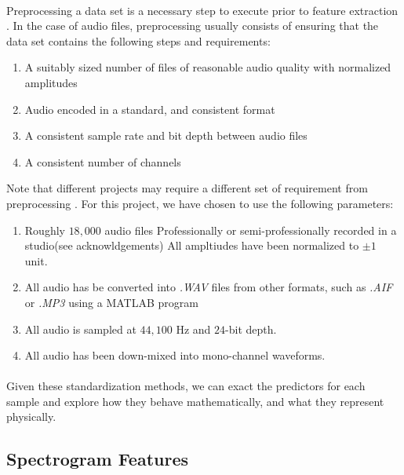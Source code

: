 \documentclass[12pt,letterpaper]{article}
\begin{document}
\paragraph*{}Preprocessing a data set is a necessary step to execute prior to feature extraction \cite{Geron2,James,Serizel}. In the case of audio files, preprocessing usually consists of ensuring that the data set contains the following steps and requirements:
\begin{enumerate}
\item A suitably sized number of files of reasonable audio quality with normalized amplitudes
\item Audio encoded in a standard, and consistent format
\item A consistent sample rate and bit depth between audio files
\item A consistent number of channels
\end{enumerate}
Note that different projects may require a different set of requirement from preprocessing \cite{Virtanen}. For this project, we have chosen to use the following parameters:
\begin{enumerate}
\item Roughly $18,000$ audio files Professionally or semi-professionally recorded in a studio(see acknowldgements) All ampltiudes have been normalized to $\pm 1$ unit.
\item All audio has be converted into \textit{.WAV} files from other formats, such as \textit{.AIF} or \textit{.MP3} using a MATLAB program
\item All audio is sampled at $44,100$ Hz and $24$-bit depth.
\item All audio has been down-mixed into mono-channel waveforms.
\end{enumerate}

\paragraph*{}Given these standardization methods, we can exact the predictors for each sample and explore how they behave mathematically, and what they represent physically.


\newpage

\subsection{Spectrogram Features}
\label{subsec-Spectrogram}
\end{document}
